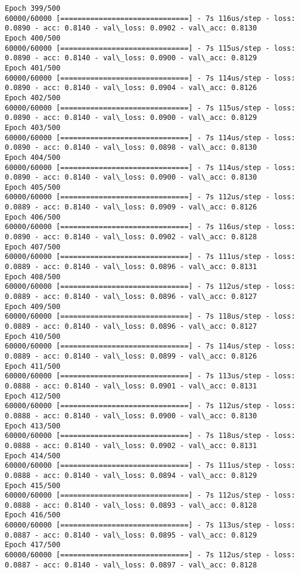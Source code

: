 \documentclass[11pt]{article}
\begin{document}
\begin{Verbatim}[commandchars=\\\{\}]
Epoch 399/500
60000/60000 [==============================] - 7s 116us/step - loss: 0.0890 - acc: 0.8140 - val\_loss: 0.0902 - val\_acc: 0.8130
Epoch 400/500
60000/60000 [==============================] - 7s 115us/step - loss: 0.0890 - acc: 0.8140 - val\_loss: 0.0900 - val\_acc: 0.8129
Epoch 401/500
60000/60000 [==============================] - 7s 114us/step - loss: 0.0890 - acc: 0.8140 - val\_loss: 0.0904 - val\_acc: 0.8126
Epoch 402/500
60000/60000 [==============================] - 7s 115us/step - loss: 0.0890 - acc: 0.8140 - val\_loss: 0.0900 - val\_acc: 0.8129
Epoch 403/500
60000/60000 [==============================] - 7s 114us/step - loss: 0.0890 - acc: 0.8140 - val\_loss: 0.0898 - val\_acc: 0.8130
Epoch 404/500
60000/60000 [==============================] - 7s 114us/step - loss: 0.0890 - acc: 0.8140 - val\_loss: 0.0900 - val\_acc: 0.8130
Epoch 405/500
60000/60000 [==============================] - 7s 112us/step - loss: 0.0889 - acc: 0.8140 - val\_loss: 0.0909 - val\_acc: 0.8126
Epoch 406/500
60000/60000 [==============================] - 7s 116us/step - loss: 0.0890 - acc: 0.8140 - val\_loss: 0.0902 - val\_acc: 0.8128
Epoch 407/500
60000/60000 [==============================] - 7s 111us/step - loss: 0.0889 - acc: 0.8140 - val\_loss: 0.0896 - val\_acc: 0.8131
Epoch 408/500
60000/60000 [==============================] - 7s 112us/step - loss: 0.0889 - acc: 0.8140 - val\_loss: 0.0896 - val\_acc: 0.8127
Epoch 409/500
60000/60000 [==============================] - 7s 118us/step - loss: 0.0889 - acc: 0.8140 - val\_loss: 0.0896 - val\_acc: 0.8127
Epoch 410/500
60000/60000 [==============================] - 7s 114us/step - loss: 0.0889 - acc: 0.8140 - val\_loss: 0.0899 - val\_acc: 0.8126
Epoch 411/500
60000/60000 [==============================] - 7s 113us/step - loss: 0.0888 - acc: 0.8140 - val\_loss: 0.0901 - val\_acc: 0.8131
Epoch 412/500
60000/60000 [==============================] - 7s 112us/step - loss: 0.0888 - acc: 0.8140 - val\_loss: 0.0900 - val\_acc: 0.8130
Epoch 413/500
60000/60000 [==============================] - 7s 118us/step - loss: 0.0888 - acc: 0.8140 - val\_loss: 0.0902 - val\_acc: 0.8131
Epoch 414/500
60000/60000 [==============================] - 7s 111us/step - loss: 0.0888 - acc: 0.8140 - val\_loss: 0.0894 - val\_acc: 0.8129
Epoch 415/500
60000/60000 [==============================] - 7s 112us/step - loss: 0.0888 - acc: 0.8140 - val\_loss: 0.0893 - val\_acc: 0.8128
Epoch 416/500
60000/60000 [==============================] - 7s 113us/step - loss: 0.0887 - acc: 0.8140 - val\_loss: 0.0895 - val\_acc: 0.8129
Epoch 417/500
60000/60000 [==============================] - 7s 112us/step - loss: 0.0887 - acc: 0.8140 - val\_loss: 0.0897 - val\_acc: 0.8128

\end{Verbatim}
\end{document}
